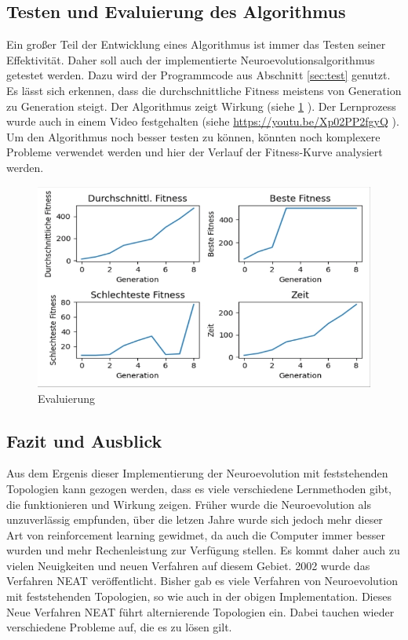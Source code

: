 \documentclass[parskip=half,titlepage]{scrartcl}
\begin{document}
\label{sec:testing}

\subsection{Testen und Evaluierung des Algorithmus}
Ein großer Teil der Entwicklung eines Algorithmus ist immer das Testen seiner Effektivität. Daher soll auch der implementierte Neuroevolutionsalgorithmus getestet werden. Dazu wird der Programmcode aus Abschnitt \cref{sec:test} genutzt. Es lässt sich erkennen, dass die durchschnittliche Fitness meistens von Generation zu Generation steigt. Der Algorithmus zeigt Wirkung (siehe \cref{fig:evaluation} ). Der Lernprozess wurde auch in einem Video festgehalten (siehe \url{https://youtu.be/Xp02PP2fgyQ} ). Um den Algorithmus noch besser testen zu können, könnten noch komplexere Probleme verwendet werden und hier der Verlauf der Fitness-Kurve analysiert werden.

\begin{figure}[h]
 \centering
 \includegraphics[scale=0.65]{Abbildungen/Evaluation.png}
 \caption{Evaluierung}
 \label{fig:evaluation}
\end{figure}

\subsection{Fazit und Ausblick}
Aus dem Ergenis dieser Implementierung der Neuroevolution mit feststehenden Topologien kann gezogen werden, dass es viele verschiedene Lernmethoden gibt, die funktionieren und Wirkung zeigen. Früher wurde die Neuroevolution als unzuverlässig empfunden, über die letzen Jahre wurde sich jedoch mehr dieser Art von reinforcement learning gewidmet, da auch die Computer immer besser wurden und mehr Rechenleistung zur Verfügung stellen. Es kommt daher auch zu vielen Neuigkeiten und neuen Verfahren auf diesem Gebiet. 2002 wurde das Verfahren NEAT veröffentlicht. Bisher gab es viele Verfahren von Neuroevolution mit feststehenden Topologien, so wie auch in der obigen Implementation. Dieses Neue Verfahren NEAT führt alternierende Topologien ein. Dabei tauchen wieder verschiedene Probleme auf, die es zu lösen gilt. 
\end{document}
